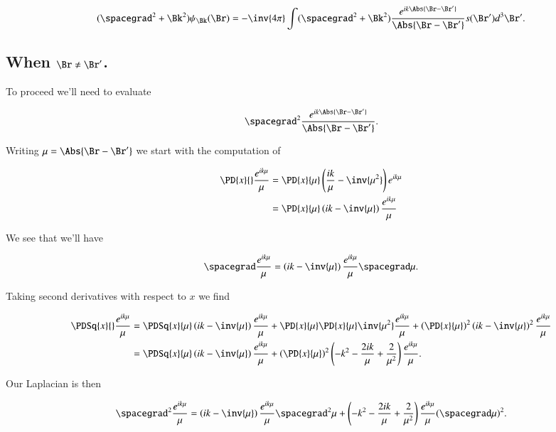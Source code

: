 \begin{equation}\label{eqn:helmholtzGreens:90}
(\spacegrad^2 + \Bk^2) \psi_\Bk(\Br) = 
- \inv{4 \pi} 
\int (\spacegrad^2 + \Bk^2) 
\frac{e^{i k \Abs{\Br - \Br'}} }{\Abs{\Br - \Br'}}
s(\Br') d^3 \Br'.
\end{equation}

\subsection{When $\Br \ne \Br'$.}

To proceed we'll need to evaluate 

\begin{equation}\label{eqn:helmholtzGreens:110}
\spacegrad^2 \frac{e^{i k \Abs{\Br - \Br'}} }{\Abs{\Br - \Br'}}.
\end{equation}

Writing $\mu = \Abs{\Br - \Br'}$ we start with the computation of

\begin{align*}
\PD{x}{} \frac{e^{i k \mu} }{\mu}
&=
\PD{x}{\mu} \left( \frac{i k}{\mu} - \inv{\mu^2} \right) e^{i k \mu} \\
&=
\PD{x}{\mu} \left( i k - \inv{\mu} \right) \frac{e^{i k \mu}}{\mu}
\end{align*}

We see that we'll have

\begin{equation}\label{eqn:helmholtzGreens:130}
\spacegrad \frac{e^{i k \mu} }{\mu} = \left( i k - \inv{\mu} \right) \frac{e^{i k \mu}}{\mu} \spacegrad \mu.
\end{equation}

Taking second derivatives with respect to $x$ we find

\begin{align*}
\PDSq{x}{} \frac{e^{i k \mu} }{\mu}
&=
\PDSq{x}{\mu} \left( i k - \inv{\mu} \right) \frac{e^{i k \mu}}{\mu}
+\PD{x}{\mu} \PD{x}{\mu} \inv{\mu^2} \frac{e^{i k \mu}}{\mu}
+\left( \PD{x}{\mu} \right)^2 \left( i k - \inv{\mu} \right)^2 \frac{e^{i k \mu}}{\mu} \\
&=
\PDSq{x}{\mu} \left( i k - \inv{\mu} \right) \frac{e^{i k \mu}}{\mu}
+\left( \PD{x}{\mu} \right)^2 
\left( -k^2 - \frac{ 2 i k }{\mu} + \frac{2}{\mu^2} \right)
\frac{e^{i k \mu}}{\mu}.
\end{align*}

Our Laplacian is then

\begin{equation}\label{eqn:helmholtzGreens:150}
\spacegrad^2
\frac{e^{i k \mu} }{\mu} =
\left( i k - \inv{\mu} \right) \frac{e^{i k \mu}}{\mu} \spacegrad^2 \mu
+
\left( -k^2 - \frac{ 2 i k }{\mu} + \frac{2}{\mu^2} \right)
\frac{e^{i k \mu}}{\mu} (\spacegrad \mu)^2.
\end{equation}

